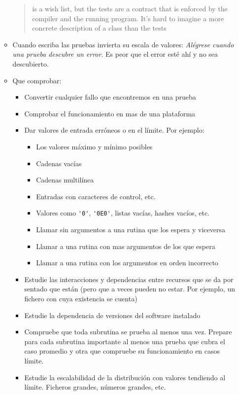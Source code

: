 \begin{itemize}
\begin{itemize}
\begin{it}
\begin{quote}
  is a wish list, but the tests are a contract
  that is enforced by the compiler and the running program.
  It's hard to imagine a more concrete description of a class than the tests
  \end{quote}
  \end{it}
  \item
  Cuando escriba las pruebas invierta su escala de valores:
  \emph{Alégrese cuando una prueba descubre un error}.
  Es peor que el error esté ahí y no sea descubierto.
  \item Que comprobar:
  \begin{itemize}
  \item
  Convertir cualquier fallo que encontremos en una prueba
  \item
  Comprobar el funcionamiento en mas de una plataforma
  \item
  Dar valores de entrada erróneos o en el límite. Por ejemplo:
  \begin{itemize}
  \item
  Los valores máximo y mínimo posibles
  \item
  Cadenas vacías
  \item
  Cadenas multilínea
  \item
  Entradas con caracteres de control, etc.
  \item
  Valores como \verb|'0'|, \verb|'0E0'|, listas vacías, hashes vacíos, etc.
  \item
  Llamar sin argumentos a una rutina que los espera y viceversa
  \item
  Llamar a una rutina con mas argumentos de los que espera
  \item
  Llamar a una rutina con los argumentos en orden incorrecto
  \end{itemize}
  \item
  Estudie las interacciones y dependencias
  entre recursos que se da por sentado que están (pero que a veces pueden
  no estar.  Por ejemplo, un fichero con cuya existencia se cuenta)
  \item
  Estudie la dependencia de versiones del software instalado
  \item
  Compruebe que toda subrutina se prueba al menos una vez.
  Prepare para cada subrutina importante al menos una prueba
  que cubra el caso promedio y otra que compruebe
  su funcionamiento en casos límite.
  \item
  Estudie la escalabilidad de la distribución con valores tendiendo
  al límite. Ficheros grandes, números grandes, etc.
  \end{itemize}



\end{itemize}
\end{itemize}
